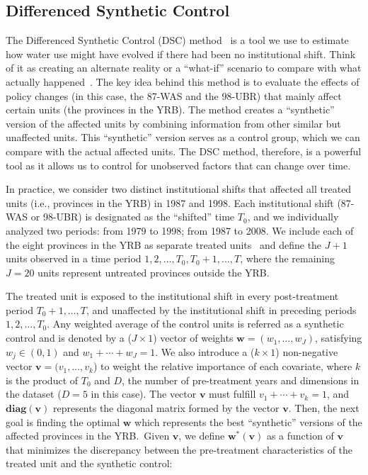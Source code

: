\documentclass[preprint, 12pt]{elsarticle}
\begin{document}
\subsection{Differenced Synthetic Control}\label{sec:DSC}

The Differenced Synthetic Control (DSC) method~\cite{arkhangelsky2021} is a tool we use to estimate how water use might have evolved if there had been no institutional shift.
Think of it as creating an alternate reality or a ``what-if'' scenario to compare with what actually happened~\cite{abadie2010, abadie2015, hill2021}.
The key idea behind this method is to evaluate the effects of policy changes (in this case, the 87-WAS and the 98-UBR) that mainly affect certain units (the provinces in the YRB).
The method creates a ``synthetic'' version of the affected units by combining information from other similar but unaffected units. This ``synthetic'' version serves as a control group, which we can compare with the actual affected units.
The DSC method, therefore, is a powerful tool as it allows us to control for unobserved factors that can change over time.

In practice, we consider two distinct institutional shifts that affected all treated units (i.e., provinces in the YRB) in 1987 and 1998.
Each institutional shift (87-WAS or 98-UBR) is designated as the ``shifted'' time $T_0$, and we individually analyzed two periods: from 1979 to 1998; from 1987 to 2008.
We include each of the eight provinces in the YRB as separate treated units~\cite{abadie2021} and define the $J+1$ units observed in a time period $1, 2, \dots, T_0, T_0 + 1, \dots, T$, where the remaining $J=20$ units represent untreated provinces outside the YRB.\

The treated unit is exposed to the institutional shift in every post-treatment period $T_0 +1, \dots, T$, and unaffected by the institutional shift in preceding periods $1, 2, \dots, T_0$.
Any weighted average of the control units is referred as a synthetic control and is denoted by a ($J \times 1$) vector of weights $\mathbf{w} = (w_{1}, \ldots ,w_{J})$, satisfying $w_j \in (0, 1)$ and $w_1 + \cdots  + w_{J} = 1$.
We also introduce a ($k \times 1$) non-negative vector $\mathbf{v} = (v_{1}, \ldots ,v_{k}$) to weight the relative importance of each covariate, where $k$ is the product of $T_0$ and $D$, the number of pre-treatment years and dimensions in the dataset ($D = 5$ in this case).
The vector $\mathbf{v}$ must fulfill $v_1 + \cdots  + v_{k} = 1$, and $\mathbf{diag(v)}$ represents the diagonal matrix formed by the vector $\mathbf{v}$.
Then, the next goal is finding the optimal $\mathbf{w}$ which represents the best ``synthetic'' versions of the affected provinces in the YRB.\
Given $\mathbf{v}$, we define $\mathbf{w^{*}(v)}$ as a function of $\mathbf{v}$ that minimizes the discrepancy between the pre-treatment characteristics of the treated unit and the synthetic control:
\end{document}
